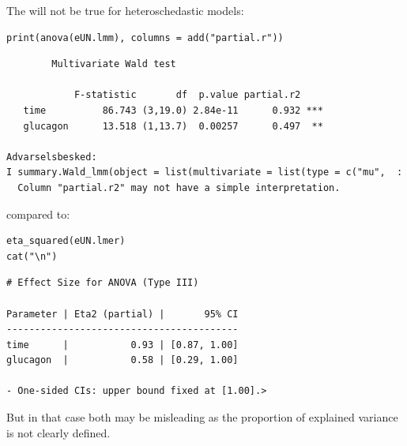 \documentclass[12pt]{article}
\begin{document}
The will not be true for heteroschedastic models:
\lstset{language=r,label= ,caption= ,captionpos=b,numbers=none}
\begin{lstlisting}
print(anova(eUN.lmm), columns = add("partial.r"))
\end{lstlisting}

\begin{verbatim}
		Multivariate Wald test 

            F-statistic       df  p.value partial.r2    
   time          86.743 (3,19.0) 2.84e-11      0.932 ***
   glucagon      13.518 (1,13.7)  0.00257      0.497  **

Advarselsbesked:
I summary.Wald_lmm(object = list(multivariate = list(type = c("mu",  :
  Column "partial.r2" may not have a simple interpretation.
\end{verbatim}


compared to:
\lstset{language=r,label= ,caption= ,captionpos=b,numbers=none}
\begin{lstlisting}
eta_squared(eUN.lmer)
cat("\n")
\end{lstlisting}

\begin{verbatim}
# Effect Size for ANOVA (Type III)

Parameter | Eta2 (partial) |       95% CI
-----------------------------------------
time      |           0.93 | [0.87, 1.00]
glucagon  |           0.58 | [0.29, 1.00]

- One-sided CIs: upper bound fixed at [1.00].>
\end{verbatim}


But in that case both may be misleading as the proportion of explained
variance is not clearly defined.
\end{document}
